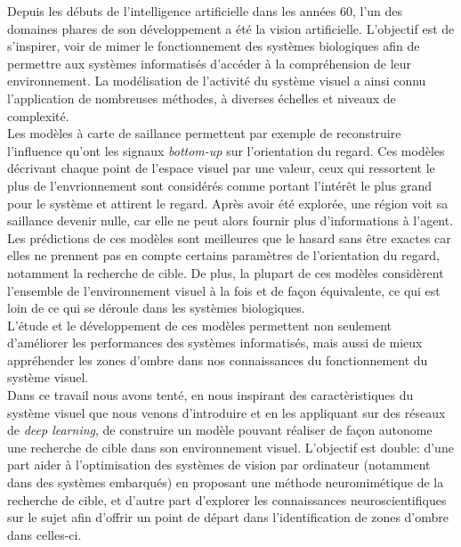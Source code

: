 
Depuis les débuts de l'intelligence artificielle dans les années 60, l'un des domaines phares de son développement a été la vision artificielle. L'objectif est de s'inspirer, voir de mimer le fonctionnement des systèmes biologiques afin de permettre aux systèmes informatisés d'accéder à la compréhension de leur environnement.
La modélisation de l'activité du système visuel a ainsi connu l'application de nombreuses méthodes, à diverses échelles et niveaux de complexité.\autocite{Werner2014} \\
Les modèles à carte de saillance permettent par exemple de reconstruire l'influence qu'ont les signaux \textit{bottom-up} sur l'orientation du regard. 
Ces modèles décrivant chaque point de l'espace visuel par une valeur, ceux qui ressortent le plus de l'envrionnement sont considérés comme portant l'intérêt le plus grand pour le système et attirent le regard. 
Après avoir été explorée, une région voit sa saillance devenir nulle, car elle ne peut alors fournir plus d'informations à l'agent.
Les prédictions de ces modèles sont meilleures que le hasard sans être exactes car elles ne prennent pas en compte certains paramètres de l'orientation du regard, notamment la recherche de cible. 
De plus, la plupart de ces modèles considèrent l'ensemble de l'environnement visuel à la fois et de façon équivalente, ce qui est loin de ce qui se déroule dans les systèmes biologiques. \autocite{Werner2014} \\

L'étude et le développement de ces modèles permettent non seulement d'améliorer les performances des systèmes informatisés, mais aussi de mieux appréhender les zones d'ombre dans nos connaissances du fonctionnement du système visuel. \autocite{Werner2014} \\

Dans ce travail nous avons tenté, en nous inspirant des caractèristiques du système visuel que nous venons d'introduire et en les appliquant sur des réseaux de \textit{deep learning}, de construire un modèle pouvant réaliser de façon autonome une recherche de cible dans son environnement visuel.
L'objectif est double: d'une part aider à l'optimisation des systèmes de vision par ordinateur (notamment dans des systèmes embarqués) en proposant une méthode neuromimétique de la recherche de cible, et d'autre part d'explorer les connaissances neuroscientifiques sur le sujet afin d'offrir un point de départ dans l'identification de zones d'ombre dans celles-ci.